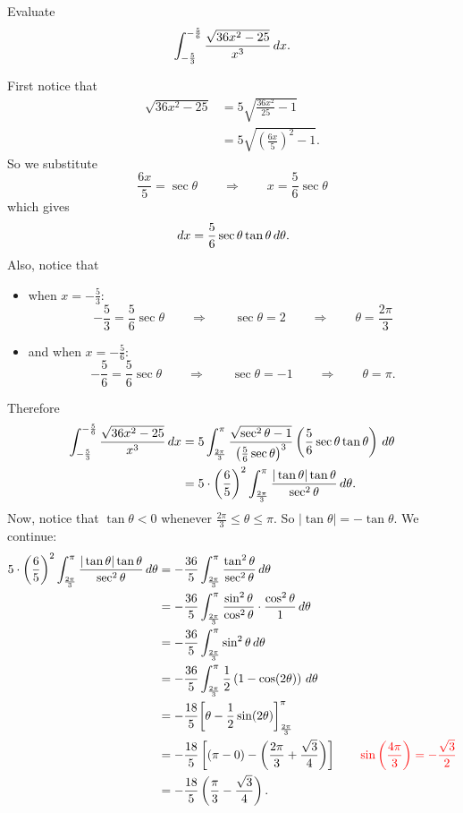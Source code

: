 \documentclass[]{ximera}
\begin{document}
\begin{problem}
Evaluate
	\[
	\int_{-\frac{5}{3}}^{-\frac{5}{6}} \frac{\sqrt{36x^2-25}}{x^3} \,d x.
	\]
	\begin{freeResponse}
	First notice that
		\begin{align*}
		\sqrt{36x^2-25} &= 5\sqrt{\frac{36x^2}{25} - 1}  \\
		&= 5\sqrt{\left( \frac{6x}{5} \right)^2 - 1}.
		\end{align*}
	So we substitute
		\[
		\frac{6x}{5} = \sec \theta	\qquad	\Longrightarrow	\qquad	x = \frac{5}{6} \sec \theta
		\]
	which gives
		\[
		\,d x = \frac{5}{6} \sec \theta \tan \theta \,d \theta  .
		\]
	Also, notice that
		\begin{itemize}
		\item when $x = - \frac{5}{3}$:
			\[
			-\frac{5}{3} = \frac{5}{6} \sec \theta \qquad	\Longrightarrow \qquad 	\sec \theta = 2 	\qquad 	\Longrightarrow 	\qquad	\theta = \frac{2\pi}{3}
			\]
			
		\item and when $x=-\frac{5}{6}$:\
			\[
			-\frac{5}{6} = \frac{5}{6} \sec \theta	\qquad	\Longrightarrow	\qquad	\sec \theta = -1	\qquad	\Longrightarrow	\qquad	\theta = \pi.
			\]
		\end{itemize}

	Therefore
		\begin{align*}
		\int_{-\frac{5}{3}}^{-\frac{5}{6}} \frac{\sqrt{36x^2-25}}{x^3} \,d x 
		&= 5 \int_{\frac{2\pi}{3}}^{\pi} \frac{\sqrt{\sec^2 \theta - 1}}{\left( \frac{5}{6} \sec \theta \right)^3} \left( \frac{5}{6} \sec \theta \tan \theta \right) \,d \theta  \\
		&= 5 \cdot \left(\frac{6}{5} \right)^2 \int_{\frac{2\pi}{3}}^{\pi} \frac{|\tan \theta| \tan \theta}{\sec^2 \theta} \,d \theta .
		\end{align*}
	Now, notice that $\tan \theta < 0$ whenever $\frac{2\pi}{3} \leq \theta \leq \pi$.  
	So $|\tan \theta| = - \tan \theta$.
	We continue:
		\begin{align*}
		5 \cdot \left(\frac{6}{5} \right)^2 \int_{\frac{2\pi}{3}}^{\pi} \frac{|\tan \theta| \tan \theta}{\sec^2 \theta} \,d \theta
		&= - \frac{36}{5} \int_{\frac{2\pi}{3}}^{\pi} \frac{\tan^2 \theta}{\sec^2 \theta} \,d \theta  \\
		&= - \frac{36}{5} \int_{\frac{2\pi}{3}}^{\pi} \frac{\sin^2 \theta}{\cos^2 \theta} \cdot \frac{\cos^2 \theta}{1} \,d \theta  \\
		&= - \frac{36}{5} \int_{\frac{2\pi}{3}}^{\pi} \sin^2 \theta \,d \theta  \\
		&= - \frac{36}{5} \int_{\frac{2\pi}{3}}^{\pi} \frac{1}{2} \left( 1 - \cos (2\theta) \right) \,d \theta  \\
		&= - \frac{18}{5} \bigg[ \theta - \frac{1}{2} \sin (2\theta) \bigg]_{\frac{2\pi}{3}}^{\pi}  \\
		&= - \frac{18}{5} \left[ \left( \pi - 0 \right) - \left( \frac{2\pi}{3} + \frac{\sqrt{3}}{4} \right) \right]  
		\qquad {\color{red} \sin \left( \frac{4\pi}{3} \right) = -\frac{\sqrt{3}}{2} }\\
		&= - \frac{18}{5} \left( \frac{\pi}{3} - \frac{\sqrt{3}}{4} \right).
		\end{align*}
	\end{freeResponse}
	

\end{problem}
\end{document}
